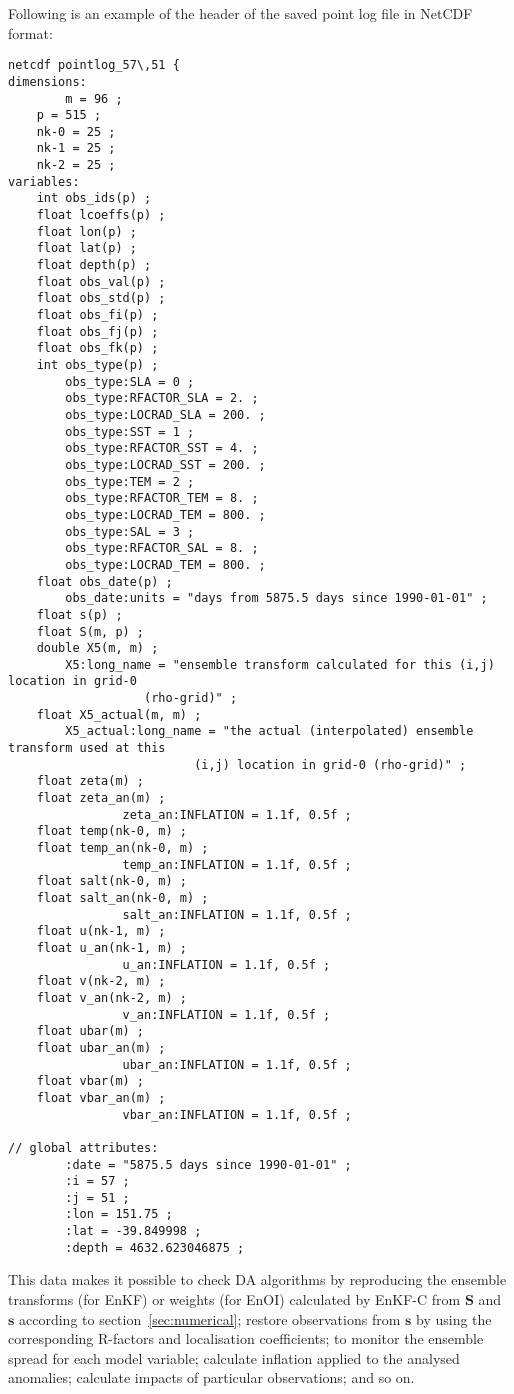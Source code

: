 \documentclass[11pt]{report}
\newcommand{\mb} {\mathbf}
\begin{document}
Following is an example of the header of the saved point log file in NetCDF format:
\begin{Verbatim}[frame=single,fontsize=\footnotesize]
netcdf pointlog_57\,51 {
dimensions:
        m = 96 ;
	p = 515 ;
	nk-0 = 25 ;
	nk-1 = 25 ;
	nk-2 = 25 ;
variables:
	int obs_ids(p) ;
	float lcoeffs(p) ;
	float lon(p) ;
	float lat(p) ;
	float depth(p) ;
	float obs_val(p) ;
	float obs_std(p) ;
	float obs_fi(p) ;
	float obs_fj(p) ;
	float obs_fk(p) ;
	int obs_type(p) ;
		obs_type:SLA = 0 ;
		obs_type:RFACTOR_SLA = 2. ;
		obs_type:LOCRAD_SLA = 200. ;
		obs_type:SST = 1 ;
		obs_type:RFACTOR_SST = 4. ;
		obs_type:LOCRAD_SST = 200. ;
		obs_type:TEM = 2 ;
		obs_type:RFACTOR_TEM = 8. ;
		obs_type:LOCRAD_TEM = 800. ;
		obs_type:SAL = 3 ;
		obs_type:RFACTOR_SAL = 8. ;
		obs_type:LOCRAD_TEM = 800. ;
	float obs_date(p) ;
		obs_date:units = "days from 5875.5 days since 1990-01-01" ;
	float s(p) ;
	float S(m, p) ;
	double X5(m, m) ;
		X5:long_name = "ensemble transform calculated for this (i,j) location in grid-0 
                   (rho-grid)" ;
	float X5_actual(m, m) ;
		X5_actual:long_name = "the actual (interpolated) ensemble transform used at this 
                          (i,j) location in grid-0 (rho-grid)" ;
	float zeta(m) ;
	float zeta_an(m) ;
                zeta_an:INFLATION = 1.1f, 0.5f ;
	float temp(nk-0, m) ;
	float temp_an(nk-0, m) ;
                temp_an:INFLATION = 1.1f, 0.5f ;
	float salt(nk-0, m) ;
	float salt_an(nk-0, m) ;
                salt_an:INFLATION = 1.1f, 0.5f ;
	float u(nk-1, m) ;
	float u_an(nk-1, m) ;
                u_an:INFLATION = 1.1f, 0.5f ;
	float v(nk-2, m) ;
	float v_an(nk-2, m) ;
                v_an:INFLATION = 1.1f, 0.5f ;
	float ubar(m) ;
	float ubar_an(m) ;
                ubar_an:INFLATION = 1.1f, 0.5f ;
	float vbar(m) ;
	float vbar_an(m) ;
                vbar_an:INFLATION = 1.1f, 0.5f ;

// global attributes:
		:date = "5875.5 days since 1990-01-01" ;
		:i = 57 ;
		:j = 51 ;
		:lon = 151.75 ;
		:lat = -39.849998 ;
		:depth = 4632.623046875 ;
\end{Verbatim}
This data makes it possible to check DA algorithms by reproducing the ensemble transforms (for EnKF) or weights (for EnOI) calculated by EnKF-C from $\mb S$ and $\mb s$ according to section~\ref{sec:numerical}; restore observations from $\mb s$ by using the corresponding R-factors and localisation coefficients; to monitor the ensemble spread for each model variable; calculate inflation applied to the analysed anomalies; calculate impacts of particular observations; and so on.
\end{document}
